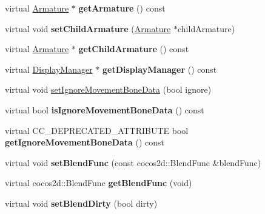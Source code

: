\begin{DoxyCompactItemize}
virtual \hyperlink{classcocostudio_1_1Armature}{Armature} $\ast$ {\bfseries get\+Armature} () const
\item 
\mbox{\label{classcocostudio_1_1Bone_a413fc33920d636fde41eb436537d409a}} 
virtual void {\bfseries set\+Child\+Armature} (\hyperlink{classcocostudio_1_1Armature}{Armature} $\ast$child\+Armature)
\item 
\mbox{\label{classcocostudio_1_1Bone_ae3a90a25d21a40b07b16ce67de355658}} 
virtual \hyperlink{classcocostudio_1_1Armature}{Armature} $\ast$ {\bfseries get\+Child\+Armature} () const
\item 
\mbox{\label{classcocostudio_1_1Bone_a14486779c09b09dbda7fd33759ade76d}} 
virtual \hyperlink{classcocostudio_1_1DisplayManager}{Display\+Manager} $\ast$ {\bfseries get\+Display\+Manager} () const
\item 
virtual void \hyperlink{classcocostudio_1_1Bone_a6c8735332243b0b39df0bc437eb0b733}{set\+Ignore\+Movement\+Bone\+Data} (bool ignore)
\item 
\mbox{\label{classcocostudio_1_1Bone_aced532bc59f76c0c1538e976d350785b}} 
virtual bool {\bfseries is\+Ignore\+Movement\+Bone\+Data} () const
\item 
\mbox{\label{classcocostudio_1_1Bone_aed65008b6c57d92cd5e649489d374f39}} 
virtual C\+C\+\_\+\+D\+E\+P\+R\+E\+C\+A\+T\+E\+D\+\_\+\+A\+T\+T\+R\+I\+B\+U\+TE bool {\bfseries get\+Ignore\+Movement\+Bone\+Data} () const
\item 
\mbox{\label{classcocostudio_1_1Bone_aa962b2ebaad93f61a87267a3292a6221}} 
virtual void {\bfseries set\+Blend\+Func} (const cocos2d\+::\+Blend\+Func \&blend\+Func)
\item 
\mbox{\label{classcocostudio_1_1Bone_a99c8c0fb967b5d0fc6239a9c385e2adb}} 
virtual cocos2d\+::\+Blend\+Func {\bfseries get\+Blend\+Func} (void)
\item 
\mbox{\label{classcocostudio_1_1Bone_a883f602b718e22ffcdda837ed529a719}} 
virtual void {\bfseries set\+Blend\+Dirty} (bool dirty)
\item 

\end{DoxyCompactItemize}
